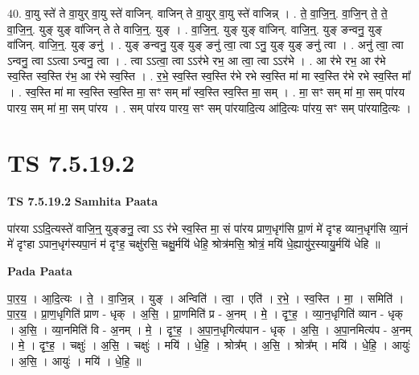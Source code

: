 \documentclass[17pt]{extarticle}
\begin{document}
40. वा॒यु स्ते॑ ते वा॒युर् वा॒यु स्ते॑ वाजिन्. वाजिन् ते वा॒युर् वा॒यु स्ते॑ वाजिन्न् । . ते॒ वा॒जि॒न्॒. वा॒जि॒न् ते॒ ते॒ वा॒जि॒न्॒. युङ् युङ् वा॑जिन् ते ते वाजि॒न्॒. युङ् । . वा॒जि॒न्॒. युङ् युङ् वा॑जिन्. वाजि॒न्॒. युङ् ङन्वनु॒ युङ् वा॑जिन्. वाजि॒न्॒. युङ् ङनु॑ । . युङ् ङन्वनु॒ युङ् युङ् ङनु॑ त्वा॒ त्वा ऽनु॒ युङ् युङ् ङनु॑ त्वा । . अनु॑ त्वा॒ त्वा ऽन्वनु॒ त्वा ऽऽत्वा ऽन्वनु॒ त्वा । . त्वा ऽऽत्वा॒ त्वा ऽऽर॑भे रभ॒ आ त्वा॒ त्वा ऽऽर॑भे । . आ र॑भे रभ॒ आ र॑भे स्व॒स्ति स्व॒स्ति र॑भ॒ आ र॑भे स्व॒स्ति । . र॒भे॒ स्व॒स्ति स्व॒स्ति र॑भे रभे स्व॒स्ति मा॑ मा स्व॒स्ति र॑भे रभे स्व॒स्ति मा᳚ । . स्व॒स्ति मा॑ मा स्व॒स्ति स्व॒स्ति मा॒ सꣳ सम् मा᳚ स्व॒स्ति स्व॒स्ति मा॒ सम् । . मा॒ सꣳ सम् मा॑ मा॒ सम् पा॑रय पारय॒ सम् मा॑ मा॒ सम् पा॑रय । . सम् पा॑रय पारय॒ सꣳ सम् पा॑रयादि॒त्य आ॑दि॒त्यः पा॑रय॒ सꣳ सम् पा॑रयादि॒त्यः । \newline
\pagebreak
{}

\section{ TS 7.5.19.2 }

\textbf{TS 7.5.19.2 } \newline
\textbf{Samhita Paata} \newline

पा॑रया ऽऽदि॒त्यस्ते॑ वाजि॒न्॒ युङ्ङनु॒ त्वा ऽऽ र॑भे स्व॒स्ति मा॒ सं पा॑रय प्राण॒धृग॑सि प्रा॒णं मे॑ दृꣳह व्यान॒धृग॑सि व्या॒नं मे॑ दृꣳहा ऽपान॒धृग॑स्यपा॒नं म॑ दृꣳह॒ चक्षु॑रसि॒ चक्षु॒र्मयि॑ धेहि॒ श्रोत्र॑मसि॒ श्रोत्रं॒ मयि॑ धे॒ह्यायु॑र॒स्यायु॒र्मयि॑ धेहि ॥ \newline

\textbf{Pada Paata} \newline

पा॒र॒य॒ । आ॒दि॒त्यः । ते॒ । वा॒जि॒न्न् । युङ् । अन्विति॑ । त्वा॒ । एति॑ । र॒भे॒ । स्व॒स्ति । मा॒ । समिति॑ । पा॒र॒य॒ । प्रा॒ण॒धृगिति॑ प्राण - धृक् । अ॒सि॒ । प्रा॒णमिति॑ प्र - अ॒नम् । मे॒ । दृꣳ॒॒ह॒ । व्या॒न॒धृगिति॑ व्यान - धृक् । अ॒सि॒ । व्या॒नमिति॑ वि - अ॒नम् । मे॒ । दृꣳ॒॒ह॒ । अ॒पा॒न॒धृगित्य॑पान - धृक् । अ॒सि॒ । अ॒पा॒नमित्य॑प - अ॒नम् । मे॒ । दृꣳ॒॒ह॒ । चक्षुः॑ । अ॒सि॒ । चक्षुः॑ । मयि॑ । धे॒हि॒ । श्रोत्र᳚म् । अ॒सि॒ । श्रोत्र᳚म् । मयि॑ । धे॒हि॒ । आयुः॑ । अ॒सि॒ । आयुः॑ । मयि॑ । धे॒हि॒ ॥  \newline
\end{document}
